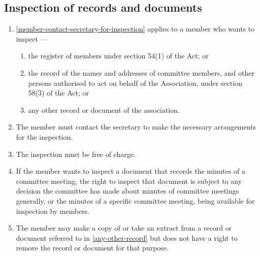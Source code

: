 \documentclass[../constitution.tex]{subfiles}
\begin{document}
\hypertarget{inspection-of-records-and-documents}{%
\subsection{Inspection of records and documents}\label{inspection-of-records-and-documents}}

\begin{enumerate}

\item {} \ref{member-contact-secretary-for-inspection} applies to a member who wants to inspect ---

  \begin{enumerate}
  
  \item the register of members under section 54(1) of the Act; or
  \item the record of the names and addresses of committee members, and other persons authorised to act on behalf of the Association, under section 58(3) of the Act; or
  \item any other record or document of the association. \label{any-other-record}
  \end{enumerate}
\item The member must contact the secretary to make the necessary arrangements for the inspection. \label{member-contact-secretary-for-inspection}
\item The inspection must be free of charge.
\item If the member wants to inspect a document that records the minutes of a committee meeting, the right to inspect that document is subject to any decision the committee has made about minutes of committee meetings generally, or the minutes of a specific committee meeting, being available for inspection by members.
\item The member may make a copy of or take an extract from a record or document referred to in  \ref{any-other-record} but does not have a right to remove the record or document for that purpose.



\end{enumerate}
\end{document}
